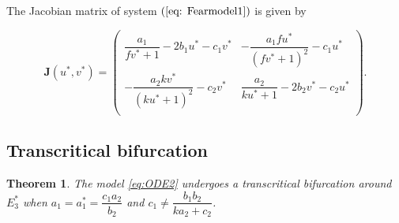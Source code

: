 \documentclass[10pt]{amsart}
\newtheorem{theorem}{Theorem}[section]
\theoremstyle{definition}
\begin{document}
The Jacobian matrix of system $(\ref{eq: Fearmodel1})$ is given by

\begin{equation}\label{jacob_main}
	\mathbf{J}(u^*,v^*)=
	\left(
	\begin{array}{cc}
		\dfrac{a_1}{fv^*+1}-2b_1u^*-c_1v^* &-\dfrac{a_1 f u^*}{(fv^*+1)^2} -c_1 u^* \\
		-\dfrac{a_2 k v^*}{(k u^*+1)^2}-c_2 v^* & \dfrac{a_2}{k u^*+1}-2 b_2 v^*-c_2 u^* \\
	\end{array}
	\right).
\end{equation}

\subsection{Transcritical bifurcation}

\begin{theorem}
The model \eqref{eq:ODE2} undergoes a transcritical bifurcation around $E_3^*$ when $a_1=a_1^*=\dfrac{c_1a_2}{b_2}$ and $c_1 \neq \dfrac{b_1b_2}{ka_2+c_2}$.
\end{theorem}
\end{document}
